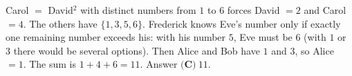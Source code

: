 Carol $=$ David$^2$ with distinct numbers from $1$ to $6$ forces David $=2$ and Carol $=4$. The others have $\{1,3,5,6\}$. Frederick knows Eve's number only if exactly one remaining number exceeds his: with his number $5$, Eve must be $6$ (with $1$ or $3$ there would be several options). Then Alice and Bob have $1$ and $3$, so Alice $=1$. The sum is $1+4+6=11$. Answer $\boxed{\textbf{(C)}\ 11}$.
